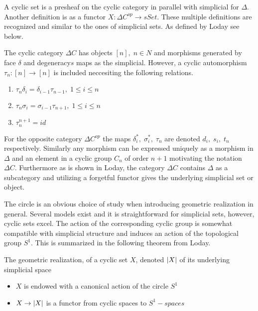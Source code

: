 \documentclass[../../main.tex]{subfiles}
\begin{document}
    A cyclic set is a presheaf on the cyclic category in parallel with  simplicial for $\Delta$. Another definition is as a functor $X:\Delta C^{op}\to sSet$. These multiple definitions are recognized and similar to the ones of simplicial sets. As defined by Loday see below.
    
    \begin{definition}
        The cyclic category $\Delta C$ has objects $[n], \;n\in N$ and morphisms generated by face $\delta$ and degeneracy$s$ maps as the simplicial. However, a cyclic automorphism $\tau_n:[n]\to [n]$ is included neccesiting the following relations.
        \begin{enumerate}
            \item $\tau _n\delta_i=\delta_{i-1}\tau_{n-1},\; 1 \leq i\leq n$
            \item $\tau _n \sigma_i=\sigma_{i-1}\tau_{n+1},\; 1 \leq i\leq n$
            \item $\tau_{n}^{n+1}=id$
        \end{enumerate}
    \end{definition}

    For the opposite category $\Delta C^{op}$ the maps $\delta_i^*, \; \sigma_i^*,\;\tau_n$ are denoted $d_i,\; s_i, \; t_n$ respectively. Similarly any morphism can be expressed uniquely as a morphism in $\Delta$ and an element in a cyclic group $C_n$ of order $n+1$ motivating the notation $\Delta C$. Furthermore as is shown in Loday, the category $\Delta C$ contains $\Delta$ as a subcategory and utilizing a forgetful functor gives the underlying simplicial set or object. 

    The circle is an obvious choice of study when introducing geometric realization in general. Several models exist and it is straightforward for simplicial sets, however, cyclic sets excel. The action of the corresponding cyclic group is somewhat compatible with simplicial structure and induces an action of the topological group $S^1$. This is summarized in the following theorem from Loday.

    \begin{theorem}
        The geometric realization, of a cyclic set $X$, denoted $\geom[X]$ of its underlying simplicial space
        \begin{itemize}
            \item $X$ is endowed with a canonical action of the circle $S^1$
            \item $X \to \geom[X]$ is a functor from cyclic spaces to $S^1-spaces$
        \end{itemize}
    \end{theorem}

    
\end{document}
